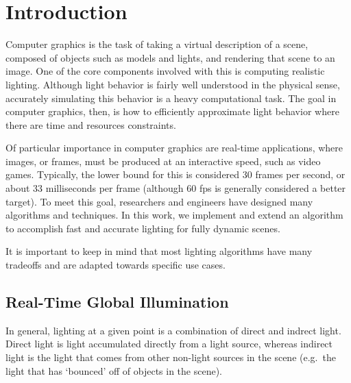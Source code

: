 \chapter{Introduction}
Computer graphics is the task of taking a virtual description of a scene, composed of objects such as models and lights, and rendering that scene to an image. One of the core components involved with this is computing realistic lighting. Although light behavior is fairly well understood in the physical sense, accurately simulating this behavior is a heavy computational task. The goal in computer graphics, then, is how to efficiently approximate light behavior where there are time and resources constraints.


Of particular importance in computer graphics are real-time applications, where images, or frames, must be produced at an interactive speed, such as video games. Typically, the lower bound for this is considered 30 frames per second, or about 33 milliseconds per frame (although 60 fps is generally considered a better target). To meet this goal, researchers and engineers have designed many algorithms and techniques.
In this work, we implement and extend an algorithm to accomplish fast and accurate lighting for fully dynamic scenes.

It is important to keep in mind that most lighting algorithms have many tradeoffs and are adapted towards specific use cases. 

\section{Real-Time Global Illumination}
In general, lighting at a given point is a combination of direct and indrect light. Direct light is light accumulated directly from a light source, whereas indirect light is the light that comes from other non-light sources in the scene (e.g.\ the light that has `bounced' off of objects in the scene).

